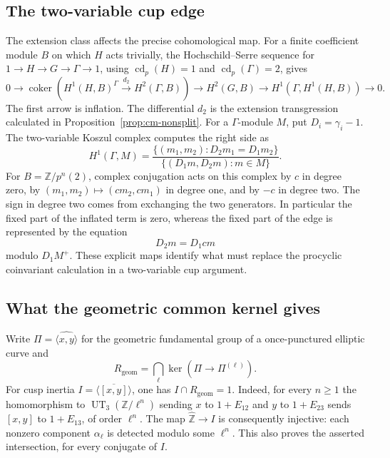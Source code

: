 \subsection{The two-variable cup edge}

The extension class affects the precise cohomological map.
For a finite coefficient module \(B\) on which \(H\) acts
trivially, the Hochschild--Serre sequence for
\(1\to H\to G\to\Gamma\to1\), using
\(\operatorname{cd}_p(H)=1\) and
\(\operatorname{cd}_p(\Gamma)=2\), gives
\[
 0\longrightarrow
 \operatorname{coker}\!\left(
  H^1(H,B)^\Gamma\xrightarrow{d_2}H^2(\Gamma,B)\right)
 \longrightarrow H^2(G,B)
 \longrightarrow H^1(\Gamma,H^1(H,B))
 \longrightarrow0 .
\]
The first arrow is inflation. The differential \(d_2\)
is the extension transgression calculated in
Proposition~\ref{prop:cm-nonsplit}.
For a \(\Gamma\)-module \(M\), put \(D_i=\gamma_i-1\).
The two-variable Koszul complex computes the right
side as
\[
 H^1(\Gamma,M)=
 \frac{\{(m_1,m_2):D_2m_1=D_1m_2\}}
      {\{(D_1m,D_2m):m\in M\}} .
\]
For \(B=\mathbb Z/p^n(2)\), complex conjugation acts on
this complex by \(c\) in degree zero, by
\((m_1,m_2)\mapsto(cm_2,cm_1)\) in degree one,
and by \(-c\) in degree two. The sign in degree two
comes from exchanging the two generators.
In particular the fixed part of the inflated term is
zero, whereas the fixed part of the edge is represented
by the equation
\[
 D_2m=D_1cm
\]
modulo \(D_1M^+\). These explicit maps identify what
must replace the procyclic coinvariant calculation
in a two-variable cup argument.



\subsection{What the geometric common kernel gives}
\label{subsec:cm-geometric-common-kernel}

Write \(\Pi=\widehat{\langle x,y\rangle}\) for the geometric
fundamental group of a once-punctured elliptic curve and
\[
 R_{\mathrm{geom}}=
 \bigcap_\ell\ker(\Pi\longrightarrow\Pi^{(\ell)}).
\]
For cusp inertia \(I=\overline{\langle[x,y]\rangle}\), one has
\(I\cap R_{\mathrm{geom}}=1\). Indeed, for every \(n\geq1\)
the homomorphism to \(\operatorname{UT}_3(\mathbb Z/\ell^n)\)
sending \(x\) to \(1+E_{12}\) and \(y\) to \(1+E_{23}\)
sends \([x,y]\) to \(1+E_{13}\), of order \(\ell^n\).
The map \(\widehat{\mathbb Z}\to I\) is consequently injective:
each nonzero component \(\alpha_\ell\) is detected modulo some
\(\ell^n\). This also proves the asserted intersection, for every
conjugate of \(I\).

